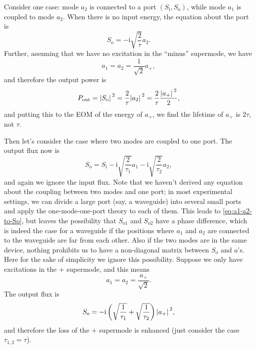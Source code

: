 \documentclass[hyperref, a4paper]{article}
\newcommand*{\ii}{\mathrm{i}}
\newcommand*{\Si}{S_{\text{i}}}
\newcommand*{\So}{S_{\text{o}}}
\begin{document}
Consider one case: mode $a_2$ is connected to a port $(\Si, \So)$,
while mode $a_1$ is coupled to mode $a_2$.
When there is no input energy, the equation about the port is 
\begin{equation}
    \So = - \ii \sqrt{\frac{2}{\tau}} a_2.
\end{equation}
Further, assuming that we have no excitation in the ``minus'' supermode, we have 
\begin{equation}
    a_1 = a_2 = \frac{1}{\sqrt{2}} a_+, 
\end{equation}
and therefore the output power is  
\begin{equation}
    P_{\text{out}} = \abs*{\So}^2 = \frac{2}{\tau} \abs*{a_2}^2
    = \frac{2}{\tau} \frac{\abs*{a_+}^2}{2} ,
\end{equation}
and putting this to the EOM of the energy of $a_+$, 
we find the lifetime of $a_+$ is $2 \tau$, not $\tau$.

Then let's consider the case where two modes are coupled to one port.
The output flux now is 
\begin{equation}
    \So = \Si - \ii \sqrt{\frac{2}{\tau_1}} a_1 - \ii \sqrt{\frac{2}{\tau_2}} a_2,
    \label{eq:a1-a2-to-So}
\end{equation}
and again we ignore the input flux.
Note that we haven't derived any equation about the coupling between two modes and one port; 
in most experimental settings, we can divide a large port (say, a waveguide) 
into several small ports and apply the one-mode-one-port theory to each of them.
This leads to \eqref{eq:a1-a2-to-So}, but leaves the possibility that 
$S_{\text{o1}}$ and $S_{\text{o2}}$ have a phase difference, 
which is indeed the case for a waveguide 
if the positions where $a_1$ and $a_2$ are connected to the waveguide  
are far from each other.
Also if the two modes are in the same device, 
nothing prohibits us to have a non-diagonal matrix between $\So$ and $a$'s.
Here for the sake of simplicity we ignore this possibility.
Suppose we only have excitations in the $+$ supermode,
and this means 
\begin{equation}
    a_1 = a_2 = \frac{a_+}{\sqrt{2}}.
\end{equation}
The output flux is 
\begin{equation}
    \So = - \ii \left(\sqrt{\frac{1}{\tau_1}} + \sqrt{\frac{1}{\tau_2}}\right) \abs*{a_+}^2,
\end{equation}
and therefore the loss of the $+$ supermode is enhanced 
(just consider the case $\tau_{1,2} = \tau$).
\end{document}
